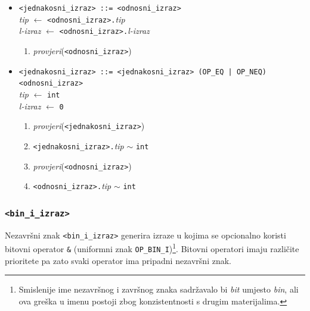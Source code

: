 \documentclass[times, 12pt, utf8]{book}
\begin{document}
\begin{itemize}

\item
\verb|<jednakosni_izraz> ::= <odnosni_izraz>|\\
\emph{tip} \(\leftarrow\) \verb|<odnosni_izraz>.|\emph{tip}\\
\emph{l-izraz} \(\leftarrow\) \verb|<odnosni_izraz>.|\emph{l-izraz}
\begin{enumerate}
\item
\emph{provjeri}(\verb|<odnosni_izraz>|)
\end{enumerate}

\item
\verb#<jednakosni_izraz> ::= <jednakosni_izraz> (OP_EQ | OP_NEQ) <odnosni_izraz>#\\
\emph{tip} \(\leftarrow\) \verb|int|\\
\emph{l-izraz} \(\leftarrow\) \verb|0|
\begin{enumerate}
\item
\emph{provjeri}(\verb|<jednakosni_izraz>|)
\item
\verb|<jednakosni_izraz>.|\emph{tip} \(\sim\) \verb|int|
\item
\emph{provjeri}(\verb|<odnosni_izraz>|)
\item
\verb|<odnosni_izraz>.|\emph{tip} \(\sim\) \verb|int|
\end{enumerate}

\end{itemize}

\subsubsection{\texttt{<bin\_i\_izraz>}}

Nezavršni znak \verb|<bin_i_izraz>| generira izraze u kojima se opcionalno koristi bitovni operator \verb|&| (uniformni znak \verb|OP_BIN_I|)\footnote{Smislenije ime nezavršnog i završnog znaka sadržavalo bi \emph{bit} umjesto \emph{bin}, ali ova greška u imenu postoji zbog konzistentnosti s drugim materijalima.}.
Bitovni operatori imaju različite prioritete pa zato svaki operator ima pripadni nezavršni znak.
\end{document}
